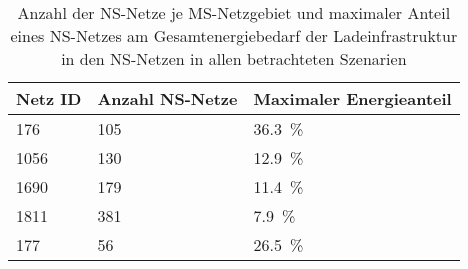 {
\renewcommand{\arraystretch}{1.2}%
\begin{table}[H]
	\begin{center}
		\caption{Anzahl der NS-Netze je MS-Netzgebiet und maximaler Anteil eines NS-Netzes am Gesamtenergiebedarf der Ladeinfrastruktur in den NS-Netzen in allen betrachteten Szenarien}
		\begin{tabu} to 0.6\textwidth {X[0.5] X[1.1, r] X[1.5, r]}
			\toprule
			Netz ID    & Anzahl NS-Netze & Maximaler Energieanteil 			\\ \midrule
			\num{176}  & \num{105}       & \SI{36.3}{\percent}              \\
			\num{1056} & \num{130}       & \SI{12.9}{\percent}              \\
			\num{1690} & \num{179}       & \SI{11.4}{\percent}              \\
			\num{1811} & \num{381}       & \SI{7.9}{\percent}               \\
			\num{177}  & \num{56}        & \SI{26.5}{\percent}              \\ \bottomrule
		\end{tabu}
		\label{tab:largestLVGridShare}
	\end{center}
	\vspace{-3mm}%
\end{table}
}